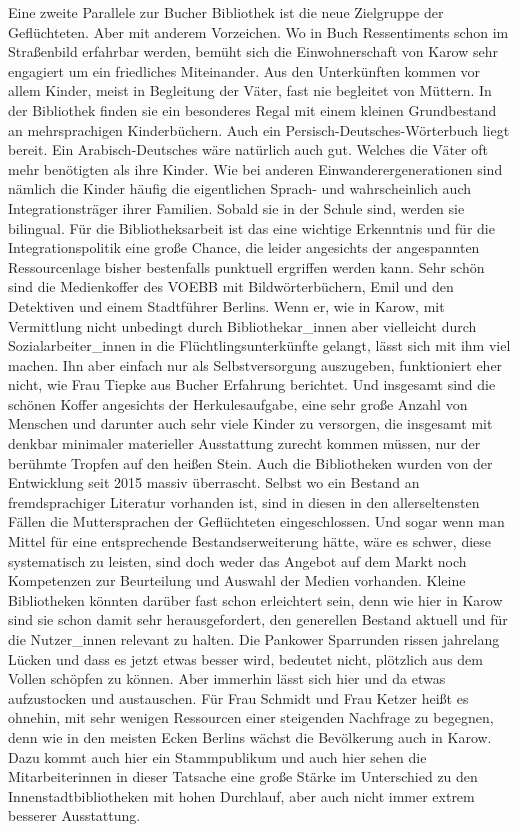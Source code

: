 \documentclass[a4paper,
fontsize=11pt,
oneside,
numbers=noperiodatend,
parskip=half-,
bibliography=totoc,
final
]{scrartcl}
\begin{document}
Eine zweite Parallele zur Bucher Bibliothek ist die neue Zielgruppe der
Geflüchteten. Aber mit anderem Vorzeichen. Wo in Buch Ressentiments
schon im Straßenbild erfahrbar werden, bemüht sich die Einwohnerschaft
von Karow sehr engagiert um ein friedliches Miteinander. Aus den
Unterkünften kommen vor allem Kinder, meist in Begleitung der Väter,
fast nie begleitet von Müttern. In der Bibliothek finden sie ein
besonderes Regal mit einem kleinen Grundbestand an mehrsprachigen
Kinderbüchern. Auch ein Persisch-Deutsches-Wörterbuch liegt bereit. Ein
Arabisch-Deutsches wäre natürlich auch gut. Welches die Väter oft mehr
benötigten als ihre Kinder. Wie bei anderen Einwanderergenerationen sind
nämlich die Kinder häufig die eigentlichen Sprach- und wahrscheinlich
auch Integrationsträger ihrer Familien. Sobald sie in der Schule sind,
werden sie bilingual. Für die Bibliotheksarbeit ist das eine wichtige
Erkenntnis und für die Integrationspolitik eine große Chance, die leider
angesichts der angespannten Ressourcenlage bisher bestenfalls punktuell
ergriffen werden kann. Sehr schön sind die Medienkoffer des VOEBB mit
Bildwörterbüchern, Emil und den Detektiven und einem Stadtführer
Berlins. Wenn er, wie in Karow, mit Vermittlung nicht unbedingt durch
Bibliothekar\_innen aber vielleicht durch Sozialarbeiter\_innen in die
Flüchtlingsunterkünfte gelangt, lässt sich mit ihm viel machen. Ihn aber
einfach nur als Selbstversorgung auszugeben, funktioniert eher nicht,
wie Frau Tiepke aus Bucher Erfahrung berichtet. Und insgesamt sind die
schönen Koffer angesichts der Herkulesaufgabe, eine sehr große Anzahl
von Menschen und darunter auch sehr viele Kinder zu versorgen, die
insgesamt mit denkbar minimaler materieller Ausstattung zurecht kommen
müssen, nur der berühmte Tropfen auf den heißen Stein. Auch die
Bibliotheken wurden von der Entwicklung seit 2015 massiv überrascht.
Selbst wo ein Bestand an fremdsprachiger Literatur vorhanden ist, sind
in diesen in den allerseltensten Fällen die Muttersprachen der
Geflüchteten eingeschlossen. Und sogar wenn man Mittel für eine
entsprechende Bestandserweiterung hätte, wäre es schwer, diese
systematisch zu leisten, sind doch weder das Angebot auf dem Markt noch
Kompetenzen zur Beurteilung und Auswahl der Medien vorhanden. Kleine
Bibliotheken könnten darüber fast schon erleichtert sein, denn wie hier
in Karow sind sie schon damit sehr herausgefordert, den generellen
Bestand aktuell und für die Nutzer\_innen relevant zu halten. Die
Pankower Sparrunden rissen jahrelang Lücken und dass es jetzt etwas
besser wird, bedeutet nicht, plötzlich aus dem Vollen schöpfen zu
können. Aber immerhin lässt sich hier und da etwas aufzustocken und
austauschen. Für Frau Schmidt und Frau Ketzer heißt es ohnehin, mit sehr
wenigen Ressourcen einer steigenden Nachfrage zu begegnen, denn wie in
den meisten Ecken Berlins wächst die Bevölkerung auch in Karow. Dazu
kommt auch hier ein Stammpublikum und auch hier sehen die
Mitarbeiterinnen in dieser Tatsache eine große Stärke im Unterschied zu
den Innenstadtbibliotheken mit hohen Durchlauf, aber auch nicht immer
extrem besserer Ausstattung.
\end{document}
